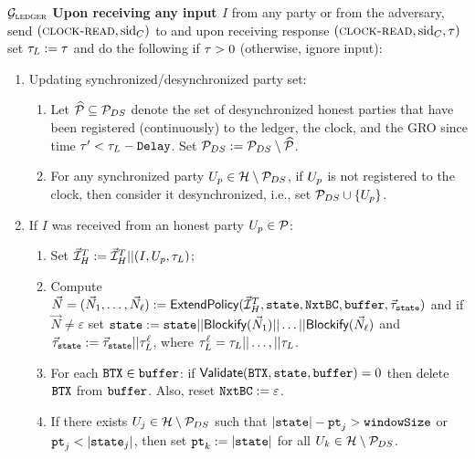\begin{systembox}{$\mathcal{G}_{\textsc{ledger}}$}
    {\bf Upon receiving any input $I$} from any party or from the adversary,
    send $(\textsc{clock-read}, \text{sid}_C)$ to \Fclock and upon receiving response
    $(\textsc{clock-read}, \text{sid}_C, \tau)$ set $\tau_L:=\tau$ and do the
    following if $\tau > 0$ (otherwise, ignore input):

    \begin{enumerate}\setlength\itemsep{1.5ex}
      \item Updating synchronized/desynchronized party set:
      \begin{enumerate}
        \item Let $\widehat{\mathcal{P}}\subseteq\mathcal{P}_{DS}$  denote the set of desynchronized
        honest parties that have been registered (continuously) to the ledger,
        the clock, and the GRO since time $\tau' < \tau_L-\texttt{Delay}$. Set
        $\mathcal{P}_{DS}:=\mathcal{P}_{DS}\setminus\widehat{\mathcal{P}}$.
        \item For any synchronized party ${U_p}\in\mathcal{H}\setminus\mathcal{P}_{DS}$, if
        ${U_p}$ is not registered to the clock, then consider it
        desynchronized, i.e., set $\mathcal{P}_{DS}\cup\{{U_p}\}$.
      \end{enumerate}
      \item If $I$ was received from an honest party ${U_p}\in\mathcal{P}$:\\[1ex]
      \begin{enumerate}\setlength\itemsep{1ex}
        \item Set $\vec{\mathcal{I}}^T_H:=\vec{\mathcal{I}}^T_H||(I,{U_p},\tau_L)$;
        \item Compute
        $\vec{N}=(\vec{N}_1,\ldots,\vec{N}_\ell):=\textsf{ExtendPolicy}(\vec{\mathcal{I}}^T_H,\texttt{state},\texttt{NxtBC},\texttt{buffer},\vec{\tau}_\texttt{state})$
        and if $\vec{N}\neq\varepsilon$ set
        $\texttt{state}:=\texttt{state}||\textsf{Blockify}(\vec{N}_1)||\ldots||\textsf{Blockify}(\vec{N}_\ell)$
        and $ \vec{\tau}_\texttt{state}:=\vec{\tau}_\texttt{state}||\tau_L^\ell$, where
        $\tau_L^\ell=\tau_L||\ldots,||\tau_L$.
        \item For each $\texttt{BTX}\in\texttt{buffer}$: if $\textsf{Validate}(\texttt{BTX},\texttt{state},\texttt{buffer})=0$
        then delete  $\texttt{BTX}$ from $\texttt{buffer}$. Also, reset $\texttt{NxtBC}:=
        \varepsilon$.
        \item If there exists $U_{j}\in\mathcal{H}\setminus\mathcal{P}_{DS}$ such that
        $|\texttt{state}| -\texttt{pt}_{j} > \texttt{windowSize}$ or $\texttt{pt}_{j} < |\texttt{state}_{j}|$, then set
        $\texttt{pt}_{k}:=|\texttt{state}|$ for all $U_{k}\in\mathcal{H}\setminus\mathcal{P}_{DS}$.
      \end{enumerate}


\end{enumerate}
\end{systembox}
